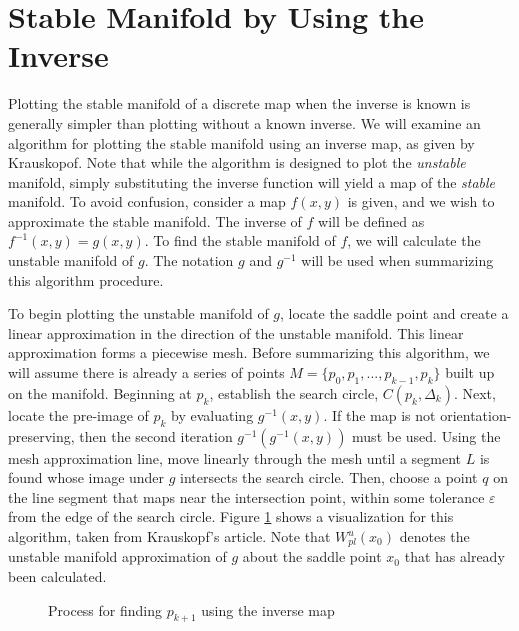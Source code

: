 \documentclass[12pt]{article}
\begin{document}
\section{Stable Manifold by Using the Inverse}

	Plotting the stable manifold of a discrete map when the inverse is known is generally simpler than plotting without a known inverse. We will examine an algorithm for plotting the stable manifold using an inverse map, as given by Krauskopof. Note that while the algorithm is designed to plot the \textit{unstable} manifold, simply substituting the inverse function will yield a map of the \textit{stable} manifold. To avoid confusion, consider a map $f(x,y)$ is given, and we wish to approximate the stable manifold. The inverse of $f$ will be defined as $f^{-1}(x,y)=g(x,y)$. To find the stable manifold of $f$, we will calculate the unstable manifold of $g$. The notation $g$ and $g^{-1}$ will be used when summarizing this algorithm procedure. 
	
	To begin plotting the unstable manifold of $g$, locate the saddle point and create a linear approximation in the direction of the unstable manifold. This linear approximation forms a piecewise mesh. Before summarizing this algorithm, we will assume there is already a series of points $M=\{p_0,p_1,...,p_{k-1},p_k\}$ built up on the manifold. Beginning at $p_k$, establish the search circle, $C(p_k,\Delta_k)$. Next, locate the pre-image of $p_k$ by evaluating $g^{-1}(x,y)$. If the map is not orientation-preserving, then the second iteration $g^{-1}(g^{-1}(x,y))$ must be used. Using the mesh approximation line, move linearly through the mesh until a segment $L$ is found whose image under $g$ intersects the search circle. Then, choose a point $q$ on the line segment that maps near the intersection point, within some tolerance $\varepsilon$ from the edge of the search circle. Figure \ref{figure:winverse} shows a visualization for this algorithm, taken from Krauskopf's article. Note that $W^u_{pl}(x_0)$ denotes the unstable manifold approximation of $g$ about the saddle point $x_0$ that has already been calculated.
	
	\begin{figure}[H]
	\caption{Process for finding $p_{k+1}$ using the inverse map}
	\label{figure:winverse}
    \end{figure}
	
\end{document}
